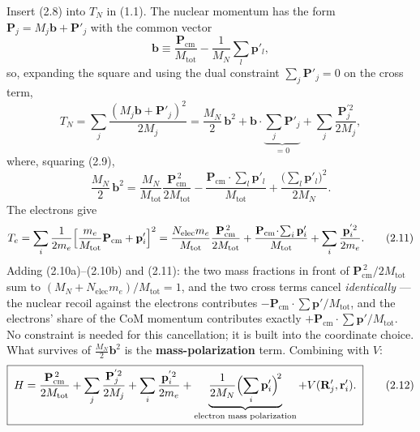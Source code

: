 Insert (2.8) into $T_N$ in (1.1). The nuclear momentum has the form $\mathbf{P}_j = M_j\mathbf{b} + \mathbf{P}'_j$ with the common vector
\begin{equation}
\mathbf{b} \equiv \frac{\mathbf{P}_{\mathrm{cm}}}{M_{\mathrm{tot}}} - \frac{1}{M_N}\sum_l\mathbf{p}'_l , \tag{2.9}
\end{equation}
so, expanding the square and using the dual constraint $\sum_j\mathbf{P}'_j=0$ on the cross term,
\begin{equation}
T_N = \sum_j\frac{(M_j\mathbf{b}+\mathbf{P}'_j)^2}{2M_j} = \frac{M_N}{2}\,\mathbf{b}^2 + \mathbf{b}\cdot\underbrace{\sum_j\mathbf{P}'_j}_{=0} + \sum_j\frac{\mathbf{P}_j^{'2}}{2M_j}, \tag{2.10a}
\end{equation}
where, squaring (2.9),
\begin{equation}
\frac{M_N}{2}\,\mathbf{b}^2 = \frac{M_N}{M_{\mathrm{tot}}}\frac{\mathbf{P}_{\mathrm{cm}}^{\,2}}{2M_{\mathrm{tot}}} - \frac{\mathbf{P}_{\mathrm{cm}}\!\cdot\!\sum_l\mathbf{p}'_l}{M_{\mathrm{tot}}} + \frac{\bigl(\sum_l\mathbf{p}'_l\bigr)^2}{2M_N}. \tag{2.10b}
\end{equation}
The electrons give
\begin{equation}
T_e = \sum_i\frac{1}{2m_e}\Bigl[\frac{m_e}{M_{\mathrm{tot}}}\mathbf{P}_{\mathrm{cm}}+\mathbf{p}'_i\Bigr]^2 = \frac{N_{\mathrm{elec}}m_e}{M_{\mathrm{tot}}}\frac{\mathbf{P}_{\mathrm{cm}}^{\,2}}{2M_{\mathrm{tot}}} + \frac{\mathbf{P}_{\mathrm{cm}}\!\cdot\!\sum_i\mathbf{p}'_i}{M_{\mathrm{tot}}} + \sum_i\frac{\mathbf{p}_i^{'2}}{2m_e}. \tag{2.11}
\end{equation}
Adding (2.10a)--(2.10b) and (2.11): the two mass fractions in front of $\mathbf{P}_{\mathrm{cm}}^{\,2}/2M_{\mathrm{tot}}$ sum to $(M_N+N_{\mathrm{elec}}m_e)/M_{\mathrm{tot}}=1$, and the two cross terms cancel \emph{identically} --- the nuclear recoil against the electrons contributes $-\mathbf{P}_{\mathrm{cm}}\!\cdot\!\sum\mathbf{p}'/M_{\mathrm{tot}}$, and the electrons' share of the CoM momentum contributes exactly $+\mathbf{P}_{\mathrm{cm}}\!\cdot\!\sum\mathbf{p}'/M_{\mathrm{tot}}$. No constraint is needed for this cancellation; it is built into the coordinate choice. What survives of $\frac{M_N}{2}\mathbf{b}^2$ is the \textbf{mass-polarization} term. Combining with $V$:
\begin{equation}
\boxed{\;H = \frac{\mathbf{P}_{\mathrm{cm}}^{\,2}}{2M_{\mathrm{tot}}} + \sum_j\frac{\mathbf{P}_j^{'2}}{2M_j} + \sum_i\frac{\mathbf{p}_i^{'2}}{2m_e} + \underbrace{\frac{1}{2M_N}\Bigl(\sum_i\mathbf{p}'_i\Bigr)^{\!2}}_{\text{electron mass polarization}} + V(\mathbf{R}'_j,\mathbf{r}'_i).\;} \tag{2.12}
\end{equation}
